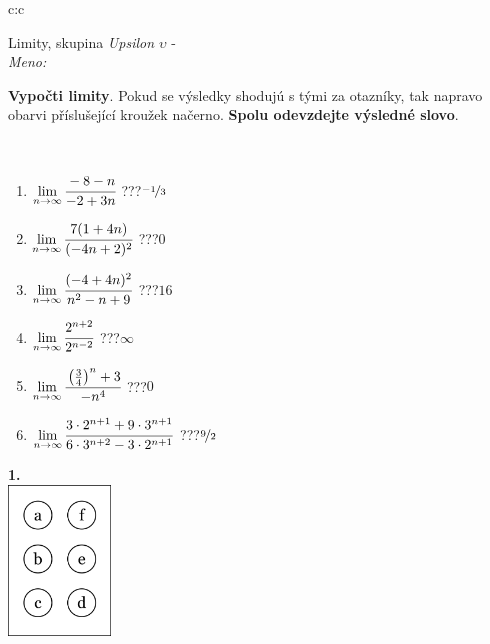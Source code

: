 \documentclass[10pt]{report}
\begin{document}
\begin{tabular}{c:c}
\begin{minipage}[c][104.5mm][t]{0.5\linewidth}
\begin{center}
\vspace{7mm}
{\huge Limity, skupina \textit{Upsilon $\upsilon$} -}\\[5mm]
\textit{Meno:}\phantom{xxxxxxxxxxxxxxxxxxxxxxxxxxxxxxxxxxxxxxxxxxxxxxxxxxxxxxxxxxxxxxxxx}\\[5mm]
\begin{minipage}{0.95\linewidth}
\begin{center}
\textbf{Vypočti limity}. Pokud se výsledky shodujú s tými za otazníky, tak napravo\\obarvi příslušející kroužek načerno. \textbf{Spolu odevzdejte výsledné slovo}.
\end{center}
\end{minipage}
\\[1mm]
\begin{minipage}{0.79\linewidth}
\begin{center}
\begin{varwidth}{\linewidth}
\begin{enumerate}
\normalsize
\item $\lim\limits_{n\to\infty}\cfrac{-8-n}{-2+3n}$\quad \dotfill\; ???\;\dotfill \quad $\nicefrac{-1}{3}$
\item $\lim\limits_{n\to\infty}\cfrac{7(1+4n)}{(-4n+2)^2}$\quad \dotfill\; ???\;\dotfill \quad $0$
\item $\lim\limits_{n\to\infty}\cfrac{(-4+4n)^2}{n^2-n+9}$\quad \dotfill\; ???\;\dotfill \quad $16$
\item $\lim\limits_{n\to\infty}\cfrac{2^{n+2}}{2^{n-2}}$\quad \dotfill\; ???\;\dotfill \quad $\infty$
\item $\lim\limits_{n\to\infty}\cfrac{\left(\frac{3}{4}\right)^n +3}{-n^{4}}$\quad \dotfill\; ???\;\dotfill \quad $0$
\item $\lim\limits_{n\to\infty}\cfrac{3\cdot 2^{n+1}+9\cdot 3^{n+1}}{6\cdot 3^{n+2}-3\cdot 2^{n+1}}$\quad \dotfill\; ???\;\dotfill \quad $\nicefrac{9}{2}$
\end{enumerate}
\end{varwidth}
\end{center}
\end{minipage}
\begin{minipage}{0.20\linewidth}
\begin{center}
{\Huge\bfseries 1.} \\[2mm]
\includegraphics[height=40mm]{../images/braille.png}

\end{center}
\end{minipage}
\end{center}
\end{minipage}
\end{tabular}
\end{document}
